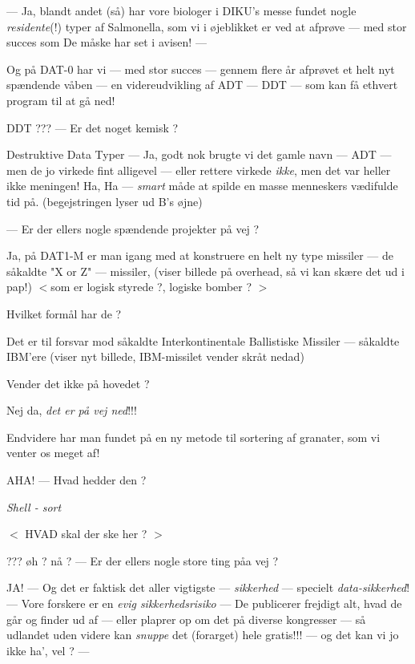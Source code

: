 \documentclass[a4paper,11pt]{article}
\begin{document}
\begin{sketch}
   ---    Ja, blandt andet (så) har vore biologer i DIKU's messe
  fundet nogle {\em residente}(!) typer af Salmonella, 
  som vi i øjeblikket er ved at afprøve --- med stor succes 
  som De måske har set i avisen! ---

  Og på DAT-0 har vi --- med stor succes --- gennem flere år 
  afprøvet et helt nyt spændende våben --- en videreudvikling af ADT ---  DDT ---  som kan få ethvert program til
  at gå ned!

          DDT ??? --- Er det noget kemisk ?

          Destruktive Data Typer --- Ja, godt nok brugte vi det 
  gamle navn --- ADT --- men de jo virkede fint alligevel --- eller 
  rettere virkede {\em ikke}, men det var heller ikke meningen!
  Ha, Ha ---  {\em smart}\/ måde at spilde en masse menneskers vædifulde tid på. 
  (begejstringen lyser ud B's øjne)
  

   ---    Er der ellers nogle spændende projekter på vej ?


          Ja, på DAT1-M er man igang med at konstruere en helt
  ny type missiler --- de såkaldte  "X or Z" --- missiler,
  (viser billede på overhead, så vi kan skære det 
  ud i pap!)
  $<$som er logisk styrede ?, logiske bomber ? $>$

          Hvilket formål har de ?

  
          Det er til forsvar mod såkaldte Interkontinentale
  Ballistiske Missiler --- såkaldte IBM'ere  
  (viser nyt billede, IBM-missilet vender skråt nedad)

          Vender det ikke på hovedet ?


          Nej da, {\em det er på vej ned}\/!!!

  Endvidere har man fundet på en ny metode til
  sortering af granater, som vi venter os meget af!

          AHA! --- Hvad hedder den ?

          {\em Shell - sort}
  

  $<$ HVAD skal der ske her ? $>$

  
   ???    øh ? nå ? --- Er der ellers nogle store ting påa vej ?

          JA! --- Og det er faktisk det aller vigtigste ---
       {\em sikkerhed}  --- specielt {\em data-sikkerhed}! --- 
       Vore forskere er en {\em evig sikkerhedsrisiko} --- De
       publicerer frejdigt alt, hvad de går og finder ud af ---
       eller plaprer op om det på diverse kongresser ---
       så udlandet uden videre kan {\em snuppe}\/ det  (forarget) 
       hele gratis!!! --- og det kan vi jo ikke ha', vel ? ---


\end{sketch}
\end{document}
